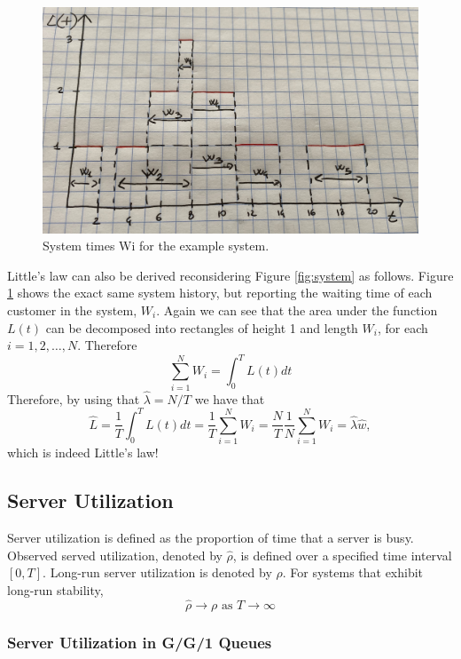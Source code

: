 \documentclass[
]{book}
\begin{document}
\begin{figure}

{\centering \includegraphics[width=0.9\linewidth]{images/system2} 

}

\caption{System times Wi for the example system.}\label{fig:system2}
\end{figure}

Little's law can also be derived reconsidering Figure \ref{fig:system} as follows. Figure \ref{fig:system2} shows the exact same system history, but reporting the waiting time of each customer in the system, \(W_i\). Again we can see that the area under the function \(L(t)\) can be decomposed into rectangles of height 1 and length \(W_i\), for each \(i=1,2,\dots,N\). Therefore
\[
\sum_{i=1}^NW_i=\int_{0}^TL(t)dt
\]
Therefore, by using that \(\hat{\lambda}=N/T\) we have that
\[
\hat{L}=\frac{1}{T}\int_{0}^TL(t)dt=\frac{1}{T}\sum_{i=1}^NW_i=\frac{N}{T}\frac{1}{N}\sum_{i=1}^NW_i=\hat\lambda\hat{w},
\]
which is indeed Little's law!

\hypertarget{server-utilization}{%
\subsection{Server Utilization}\label{server-utilization}}

Server utilization is defined as the proportion of time that a server is busy. Observed served utilization, denoted by \(\hat{\rho}\), is defined over a specified time interval \([0,T]\). Long-run server utilization is denoted by \(\rho\). For systems that exhibit long-run stability,
\[
\hat{\rho}\rightarrow \rho \mbox{ as } T\rightarrow \infty
\]

\hypertarget{server-utilization-in-gg1-queues}{%
\subsubsection{Server Utilization in G/G/1 Queues}\label{server-utilization-in-gg1-queues}}
\end{document}
